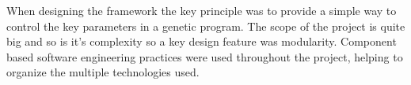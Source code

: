 When designing the framework the key principle was to provide a simple way to control the key parameters in a genetic program.
The scope of the project is quite big and so is it's complexity so a key design feature was modularity. Component based software
engineering practices were used throughout the project, helping to organize the multiple technologies used.